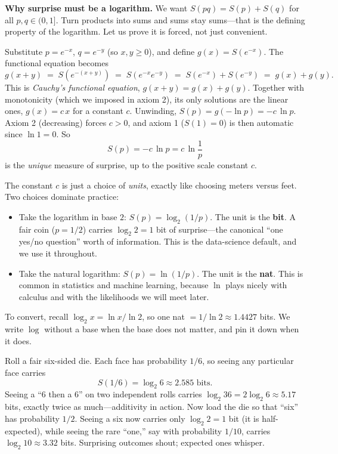 \begin{whybox}
\textbf{Why surprise must be a logarithm.} We want $S(pq) = S(p) + S(q)$ for all $p,q \in (0,1]$. Turn
products into sums and sums stay sums---that is the defining property of the logarithm. Let us prove it is
forced, not just convenient.

Substitute $p = e^{-x}$, $q = e^{-y}$ (so $x,y \ge 0$), and define $g(x) = S(e^{-x})$. The functional
equation becomes
\[
  g(x + y) \;=\; S(e^{-(x+y)}) \;=\; S(e^{-x} e^{-y}) \;=\; S(e^{-x}) + S(e^{-y}) \;=\; g(x) + g(y).
\]
This is \emph{Cauchy's functional equation}, $g(x+y) = g(x) + g(y)$. Together with monotonicity (which we
imposed in axiom 2), its only solutions are the linear ones, $g(x) = c\,x$ for a constant $c$. Unwinding,
$S(p) = g(-\ln p) = -c\,\ln p$. Axiom 2 (decreasing) forces $c > 0$, and axiom 1 ($S(1)=0$) is then
automatic since $\ln 1 = 0$. So
\[
  \boxed{\,S(p) = -c\,\ln p = c\,\ln\frac{1}{p}\,}
\]
is the \emph{unique} measure of surprise, up to the positive scale constant $c$.
\end{whybox}

The constant $c$ is just a choice of \emph{units}, exactly like choosing meters versus feet. Two choices
dominate practice:

\begin{itemize}
  \item Take the logarithm in base $2$: $S(p) = \log_2(1/p)$. The unit is the \textbf{bit}. A fair coin
        ($p = 1/2$) carries $\log_2 2 = 1$ bit of surprise---the canonical ``one yes/no question''
        worth of information. This is the data-science default, and we use it throughout.
  \item Take the natural logarithm: $S(p) = \ln(1/p)$. The unit is the \textbf{nat}. This is common in
        statistics and machine learning, because $\ln$ plays nicely with calculus and with the
        likelihoods we will meet later.
\end{itemize}

To convert, recall $\log_2 x = \ln x / \ln 2$, so one nat $= 1/\ln 2 \approx 1.4427$ bits. We write $\log$
without a base when the base does not matter, and pin it down when it does.

\begin{example}
\label{ch33:die-surprise}
Roll a fair six-sided die. Each face has probability $1/6$, so seeing any particular face carries
\[
  S(1/6) = \log_2 6 \approx 2.585 \text{ bits}.
\]
Seeing a ``$6$ then a $6$'' on two independent rolls carries $\log_2 36 = 2\log_2 6 \approx 5.17$ bits,
exactly twice as much---additivity in action. Now load the die so that ``six'' has probability $1/2$.
Seeing a six now carries only $\log_2 2 = 1$ bit (it is half-expected), while seeing the rare ``one,''
say with probability $1/10$, carries $\log_2 10 \approx 3.32$ bits. Surprising outcomes shout; expected
ones whisper.
\end{example}

